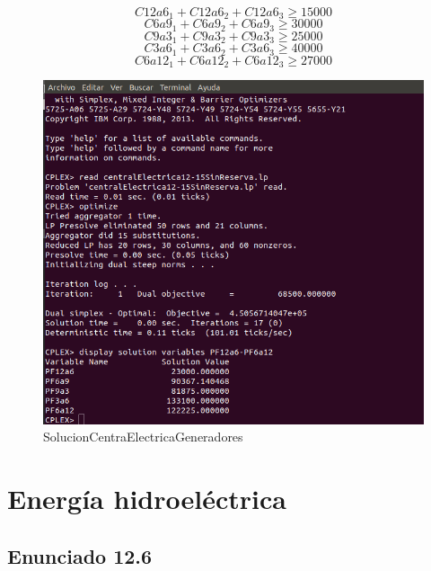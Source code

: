 \begin{equation}
C12a6_{1} + C12a6_{2} + C12a6_{3} \geq 15000
\end{equation}
\begin{equation}
C6a9_{1} + C6a9_{2} + C6a9_{3} \geq 30000
\end{equation}
\begin{equation}
C9a3_{1} + C9a3_{2} + C9a3_{3} \geq 25000
\end{equation}
\begin{equation}
C3a6_{1} + C3a6_{2} + C3a6_{3} \geq 40000
\end{equation}
\begin{equation}
C6a12_{1} + C6a12_{2} + C6a12_{3} \geq 27000
\end{equation}

\begin{figure}[!h]
    \centering
    \includegraphics[scale=0.35]{modelos/SolutionCentralElectrica12-15PrecioPorRangoSinReserva.png}
    \caption{SolucionCentraElectricaGeneradores}
\end{figure}

\section{Energía hidroeléctrica}
\subsection{Enunciado 12.6}
